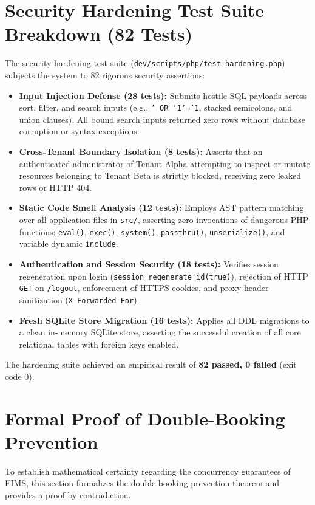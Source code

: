 \section{Security Hardening Test Suite Breakdown (82 Tests)}
\label{sec:test_hardening}
The security hardening test suite (\texttt{dev/scripts/php/test-hardening.php}) subjects the system to 82 rigorous security assertions:

\begin{itemize}
    \item \textbf{Input Injection Defense (28 tests):} Submits hostile SQL payloads across sort, filter, and search inputs (e.g., \texttt{' OR '1'='1}, stacked semicolons, and union clauses). All bound search inputs returned zero rows without database corruption or syntax exceptions.
    \item \textbf{Cross-Tenant Boundary Isolation (8 tests):} Asserts that an authenticated administrator of Tenant Alpha attempting to inspect or mutate resources belonging to Tenant Beta is strictly blocked, receiving zero leaked rows or HTTP 404.
    \item \textbf{Static Code Smell Analysis (12 tests):} Employs AST pattern matching over all application files in \texttt{src/}, asserting zero invocations of dangerous PHP functions: \texttt{eval()}, \texttt{exec()}, \texttt{system()}, \texttt{passthru()}, \texttt{unserialize()}, and variable dynamic \texttt{include}.
    \item \textbf{Authentication and Session Security (18 tests):} Verifies session regeneration upon login (\texttt{session\_regenerate\_id(true)}), rejection of HTTP \texttt{GET} on \texttt{/logout}, enforcement of HTTPS cookies, and proxy header sanitization (\texttt{X-Forwarded-For}).
    \item \textbf{Fresh SQLite Store Migration (16 tests):} Applies all DDL migrations to a clean in-memory SQLite store, asserting the successful creation of all core relational tables with foreign keys enabled.
\end{itemize}

The hardening suite achieved an empirical result of \textbf{82 passed, 0 failed} (exit code 0).

\section{Formal Proof of Double-Booking Prevention}
\label{sec:test_formal_proof}
To establish mathematical certainty regarding the concurrency guarantees of EIMS, this section formalizes the double-booking prevention theorem and provides a proof by contradiction.

